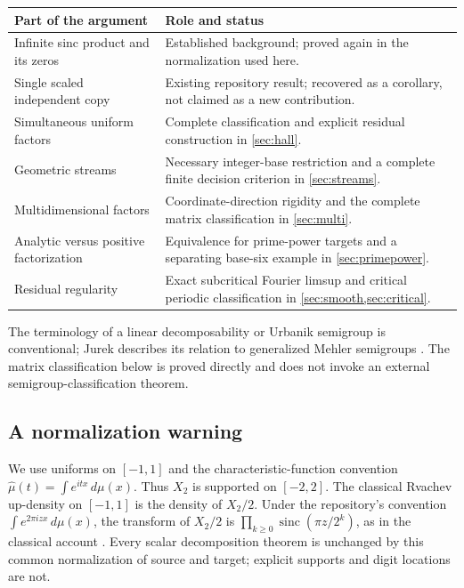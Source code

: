 \documentclass[11pt,a4paper]{article}
\theoremstyle{remark}
\newcommand{\sinc}{\operatorname{sinc}}
\newcommand{\cf}[1]{\widehat{#1}}
\begin{document}
\begin{center}
\begin{tabularx}{\textwidth}{@{}p{}X@{}}
\toprule
Part of the argument & Role and status \\
\midrule
Infinite sinc product and its zeros & Established background; proved again in the normalization used here. \\
Single scaled independent copy & Existing repository result; recovered as a corollary, not claimed as a new contribution. \\
Simultaneous uniform factors & Complete classification and explicit residual construction in \cref{sec:hall}. \\
Geometric streams & Necessary integer-base restriction and a complete finite decision criterion in \cref{sec:streams}. \\
Multidimensional factors & Coordinate-direction rigidity and the complete matrix classification in \cref{sec:multi}. \\
Analytic versus positive factorization & Equivalence for prime-power targets and a separating base-six example in \cref{sec:primepower}. \\
Residual regularity & Exact subcritical Fourier limsup and critical periodic classification in \cref{sec:smooth,sec:critical}. \\
\bottomrule
\end{tabularx}
\end{center}

The terminology of a linear decomposability or Urbanik semigroup is conventional;
Jurek describes its relation to generalized Mehler semigroups \cite{Jurek}.
The matrix classification below is proved directly and does not invoke an
external semigroup-classification theorem.

\subsection{A normalization warning}

We use uniforms on $[-1,1]$ and the characteristic-function convention
$\cf\mu(t)=\int e^{itx}\,d\mu(x)$. Thus $X_2$ is supported on $[-2,2]$.
The classical Rvachev up-density on $[-1,1]$ is the density of $X_2/2$.
Under the repository's convention $\int e^{2\pi izx}\,d\mu(x)$, the transform of
$X_2/2$ is $\prod_{k\ge0}\sinc(\pi z/2^k)$, as in the classical account
\cite{Arias}. Every scalar decomposition theorem is unchanged by this common
normalization of source and target; explicit supports and digit locations are not.
\end{document}
